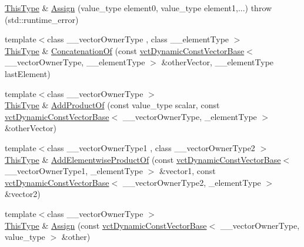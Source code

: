 \begin{DoxyCompactItemize}
\item 
\hyperlink{classvct_dynamic_const_vector_base_a39da273523717f678f54d3321ebca3dd}{This\+Type} \& \hyperlink{classvct_dynamic_vector_base_a769dc8306b512b908e694195a3b99831}{Assign} (value\+\_\+type element0, value\+\_\+type element1,...)  throw (std\+::runtime\+\_\+error)
\item 
{\footnotesize template$<$class \+\_\+\+\_\+vector\+Owner\+Type , class \+\_\+\+\_\+element\+Type $>$ }\\\hyperlink{classvct_dynamic_const_vector_base_a39da273523717f678f54d3321ebca3dd}{This\+Type} \& \hyperlink{classvct_dynamic_vector_base_a821f0b7240811f28a154aab6dd91f5e6}{Concatenation\+Of} (const \hyperlink{classvct_dynamic_const_vector_base}{vct\+Dynamic\+Const\+Vector\+Base}$<$ \+\_\+\+\_\+vector\+Owner\+Type, \+\_\+\+\_\+element\+Type $>$ \&other\+Vector, \+\_\+\+\_\+element\+Type last\+Element)
\item 
{\footnotesize template$<$class \+\_\+\+\_\+vector\+Owner\+Type $>$ }\\\hyperlink{classvct_dynamic_const_vector_base_a39da273523717f678f54d3321ebca3dd}{This\+Type} \& \hyperlink{classvct_dynamic_vector_base_a26a9316f13b80d311bb2eb356503e5f7}{Add\+Product\+Of} (const value\+\_\+type scalar, const \hyperlink{classvct_dynamic_const_vector_base}{vct\+Dynamic\+Const\+Vector\+Base}$<$ \+\_\+\+\_\+vector\+Owner\+Type, \+\_\+element\+Type $>$ \&other\+Vector)
\item 
{\footnotesize template$<$class \+\_\+\+\_\+vector\+Owner\+Type1 , class \+\_\+\+\_\+vector\+Owner\+Type2 $>$ }\\\hyperlink{classvct_dynamic_const_vector_base_a39da273523717f678f54d3321ebca3dd}{This\+Type} \& \hyperlink{classvct_dynamic_vector_base_af6ce0db0da09b89aff853c3029ec90e1}{Add\+Elementwise\+Product\+Of} (const \hyperlink{classvct_dynamic_const_vector_base}{vct\+Dynamic\+Const\+Vector\+Base}$<$ \+\_\+\+\_\+vector\+Owner\+Type1, \+\_\+element\+Type $>$ \&vector1, const \hyperlink{classvct_dynamic_const_vector_base}{vct\+Dynamic\+Const\+Vector\+Base}$<$ \+\_\+\+\_\+vector\+Owner\+Type2, \+\_\+element\+Type $>$ \&vector2)
\end{DoxyCompactItemize}
{\bf }\par
\begin{DoxyCompactItemize}
\item 
{\footnotesize template$<$class \+\_\+\+\_\+vector\+Owner\+Type $>$ }\\\hyperlink{classvct_dynamic_const_vector_base_a39da273523717f678f54d3321ebca3dd}{This\+Type} \& \hyperlink{classvct_dynamic_vector_base_a0d174f0a9557fd562de13324c14e0b92}{Assign} (const \hyperlink{classvct_dynamic_const_vector_base}{vct\+Dynamic\+Const\+Vector\+Base}$<$ \+\_\+\+\_\+vector\+Owner\+Type, value\+\_\+type $>$ \&other)
\end{DoxyCompactItemize}

